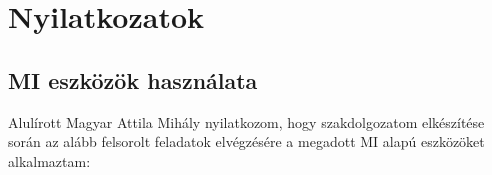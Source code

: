 \documentclass[UTF8,noindent,nohyp,parspace,titlepage,a4paper,12pt]{article}
\begin{document}
\clearpage

  \nocite{*}
  \printbibliography[heading=bibintoc]

\clearpage

  \section*{Nyilatkozatok}

    \subsection*{MI eszközök használata}

      Alulírott Magyar Attila Mihály nyilatkozom, hogy szakdolgozatom
      elkészítése során az alább felsorolt feladatok elvégzésére a megadott
      MI alapú eszközöket alkalmaztam:
\end{document}
